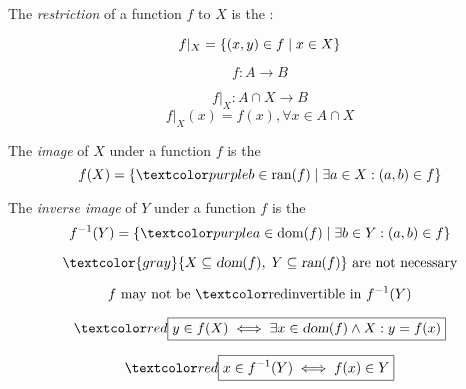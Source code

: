 
\begin{frame}{}
  \begin{definition}[Restriction]
    The {\it restriction} of a function $f$ to $X$ is the :

    \[
      f|_{X} = \{(x, y) \in f \mid x \in X\}
    \]
  \end{definition}

  \[
    f: A \to B
  \]

  \pause
  \[
    f|_{X}: A \cap X \to B
  \]
  \[
    f|_{X}(x) = f(x), \forall x \in A \cap X
  \]
\end{frame}

\begin{frame}{}
  \begin{definition}[Image]
    The {\it image} of $X$ under a function $f$ is the 
    \[
      {f(X) = \set{\purple{b \in \text{ran}(f)} \mid \exists a \in X: (a, b) \in f}}
    \]
  \end{definition}

  \vspace{0.50cm}
  \begin{definition}
    The {\it inverse image} of $Y$ under a function $f$ is the 
    \[
      {f^{-1}(Y) = \set{\purple{a \in \text{dom}(f)} \mid \exists b \in Y: (a, b) \in f}}
    \]
  \end{definition}

  \pause
  \[
    \textcolor{gray}{X \subseteq \dom{f},\; Y \subseteq \ran{f}} \text{ are not necessary}
  \]

  \pause
  \[
    f \text{ may not be \red{invertible} in } f^{-1}(Y)
  \]
\end{frame}

\begin{frame}{}
  \[
    \red{\boxed{y \in f(X) \iff \exists x \in \dom{f} \land X: y = f(x)}}
  \]

  \vspace{0.60cm}
  \[
    \red{\boxed{x \in f^{-1}(Y) \iff f(x) \in Y}}
  \]
\end{frame}

